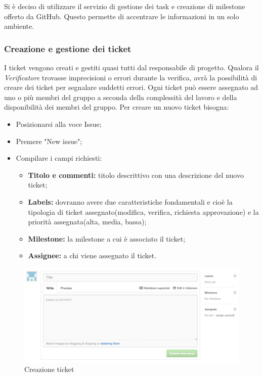 Si è deciso di utilizzare il servizio di gestione dei \gls{task} e creazione di \gls{milestone} offerto da \gls{GitHub}. Questo permette di accentrare le informazioni in un solo ambiente.\\

\subsubsection{Creazione e gestione dei ticket}

I \gls{ticket} vengono creati e gestiti quasi tutti dal responsabile di progetto.
Qualora il \textit{Verificatore} trovasse imprecisioni o errori durante la verifica, avrà la possibilità di creare dei \gls{ticket} per segnalare suddetti errori.
Ogni \gls{ticket} può essere assegnato ad uno o più membri del gruppo a seconda della complessità del lavoro e della disponibilità dei membri del gruppo.
Per creare un nuovo \gls{ticket} bisogna:

\begin{itemize}
	\item Posizionarsi alla voce Issue;
	\item Premere "New issue";
	\item Compilare i campi richiesti:
		\begin{itemize}
			\item \textbf{Titolo e commenti:} titolo descrittivo con una descrizione del nuovo \gls{ticket};
			\item \textbf{Labels:} dovranno avere due caratteristiche fondamentali e cioè la tipologia di \gls{ticket} assegnato(modifica, verifica, richiesta approvazione) e la priorità assegnata(alta, media, bassa);
			\item \textbf{\gls{Milestone}:} la \gls{milestone} a cui è associato il \gls{ticket};
			\item \textbf{Assignee:} a chi viene assegnato il \gls{ticket}.
		\end{itemize}
\end{itemize}
\begin{figure}[h]
\centering
\includegraphics[width=0.7\linewidth]{img/ticket}
\caption[Creazione ticket]{Creazione \gls{ticket}}
\label{fig:ticket}
\end{figure}


